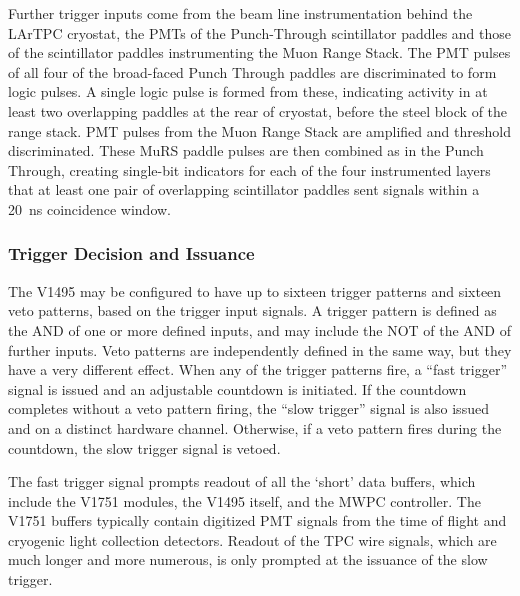 Further trigger inputs come from the beam line instrumentation behind the LArTPC cryostat, the PMTs of the Punch-Through scintillator paddles and those of the scintillator paddles instrumenting the Muon Range Stack.  The PMT pulses of all four of the broad-faced Punch Through paddles are discriminated to form logic pulses.  A single logic pulse is formed from these, indicating activity in at least two overlapping paddles at the rear of cryostat, before the steel block of the range stack.  PMT pulses from the Muon Range Stack are amplified and threshold discriminated.  These MuRS paddle pulses are then combined as in the Punch Through, creating single-bit indicators for each of the four instrumented layers that at least one pair of overlapping scintillator paddles sent signals within a 20~ns coincidence window.

\subsubsection{Trigger Decision and Issuance}

The V1495 may be configured to have up to sixteen trigger patterns and sixteen veto patterns, based on the trigger input signals.  A trigger pattern is defined as the AND of one or more defined inputs, and may include the NOT of the AND of further inputs.  Veto patterns are independently defined in the same way, but they have a very different effect.  When any of the trigger patterns fire, a ``fast trigger'' signal is issued and an adjustable countdown is initiated.  If the countdown completes without a veto pattern firing, the ``slow trigger'' signal is also issued and on a distinct hardware channel. Otherwise, if a veto pattern fires during the countdown, the slow trigger signal is vetoed.  

The fast trigger signal prompts readout of all the `short' data buffers, which include the V1751 modules, the V1495 itself, and the MWPC controller.  The V1751 buffers typically contain digitized PMT signals from the time of flight and cryogenic light collection detectors. Readout of the TPC wire signals, which are much longer and more numerous, is only prompted at the issuance of the slow trigger.

